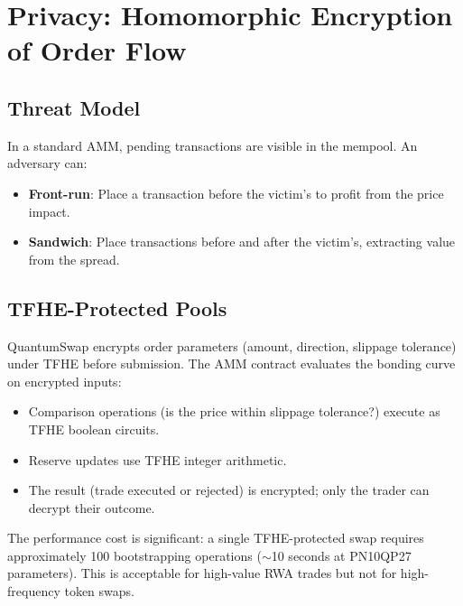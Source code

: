 \section{Privacy: Homomorphic Encryption of Order Flow}


\subsection{Threat Model}

In a standard AMM, pending transactions are visible in the mempool.
An adversary can:
\begin{itemize}[nosep]
  \item \textbf{Front-run}: Place a transaction before the victim's to
        profit from the price impact.
  \item \textbf{Sandwich}: Place transactions before and after the
        victim's, extracting value from the spread.
\end{itemize}

\subsection{TFHE-Protected Pools}

QuantumSwap encrypts order parameters (amount, direction, slippage
tolerance) under TFHE before submission. The AMM contract evaluates
the bonding curve on encrypted inputs:

\begin{itemize}[nosep]
  \item Comparison operations (is the price within slippage tolerance?)
        execute as TFHE boolean circuits.
  \item Reserve updates use TFHE integer arithmetic.
  \item The result (trade executed or rejected) is encrypted; only
        the trader can decrypt their outcome.
\end{itemize}

The performance cost is significant: a single TFHE-protected swap
requires approximately 100 bootstrapping operations ($\sim$10 seconds
at PN10QP27 parameters). This is acceptable for high-value RWA
trades but not for high-frequency token swaps.

